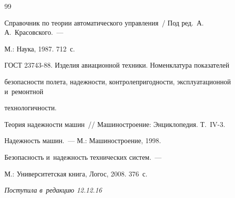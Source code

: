 {{\begin{thebibliography}{99}

Справочник по теории автоматического управления~/ Под ред.\ А.\,А.~Красовского.~--- 

М.: Наука, 1987. 712~с.












ГОСТ 23743-88. Изделия авиационной техники. Номенклатура показателей 

без\-опас\-ности полета, надежности, контролепригодности, эксплуатационной и~ремонтной 

технологичности.



Теория надежности машин~/\!\!/ Машиностроение: Энциклопедия.  Т.~IV-3.

Надежность машин.~--- М.: Машиностроение, 1998.





Безопасность и~надежность технических систем.~--- 

М.: Университетская книга, Логос, 2008. 376~с.





       \end{thebibliography}

} }





\vspace*{-3pt}



\hfill{\small\textit{Поступила в~редакцию 12.12.16}}















\newpage







